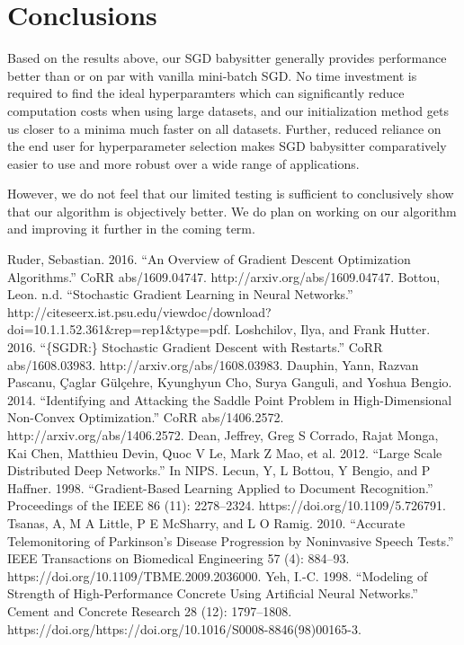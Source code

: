 \documentclass{article}
\begin{document}
\section{Conclusions}
\par Based on the results above, our SGD babysitter generally provides performance better than or on par with vanilla mini-batch SGD. No time investment is required to find the ideal hyperparamters which can significantly reduce computation costs when using large datasets, and our initialization method gets us closer to a minima much faster on all datasets. Further, reduced reliance on the end user for hyperparameter selection makes SGD babysitter comparatively easier to use and more robust over a wide range of applications. 

\par However, we do not feel that our limited testing is sufficient to conclusively show that our algorithm is objectively better. We do plan on working on our algorithm and improving it further in the coming term.
 
\newpage
[1] Ruder, Sebastian. 2016. “An Overview of Gradient Descent Optimization Algorithms.” CoRR abs/1609.04747. http://arxiv.org/abs/1609.04747. \newline \newline
[2] Bottou, Leon. n.d. “Stochastic Gradient Learning in Neural Networks.” http://citeseerx.ist.psu.edu/viewdoc/download?doi=10.1.1.52.361\&rep=rep1\&type=pdf.
\newline \newline
[3] Loshchilov, Ilya, and Frank Hutter. 2016. “\{SGDR:\} Stochastic Gradient Descent with Restarts.” CoRR abs/1608.03983. http://arxiv.org/abs/1608.03983.
\newline \newline
[4] Dauphin, Yann, Razvan Pascanu, Çaglar Gülçehre, Kyunghyun Cho, Surya Ganguli, and Yoshua Bengio. 2014. “Identifying and Attacking the Saddle Point Problem in High-Dimensional Non-Convex Optimization.” CoRR abs/1406.2572. http://arxiv.org/abs/1406.2572.
\newline \newline
[5] Dean, Jeffrey, Greg S Corrado, Rajat Monga, Kai Chen, Matthieu Devin, Quoc V Le, Mark Z Mao, et al. 2012. “Large Scale Distributed Deep Networks.” In NIPS.
\newline \newline
[6] Lecun, Y, L Bottou, Y Bengio, and P Haffner. 1998. “Gradient-Based Learning Applied to Document Recognition.” Proceedings of the IEEE 86 (11): 2278–2324. https://doi.org/10.1109/5.726791.
\newline \newline
[7] Tsanas, A, M A Little, P E McSharry, and L O Ramig. 2010. “Accurate Telemonitoring of Parkinson’s Disease Progression by Noninvasive Speech Tests.” IEEE Transactions on Biomedical Engineering 57 (4): 884–93. https://doi.org/10.1109/TBME.2009.2036000.
\newline \newline
[8] Yeh, I.-C. 1998. “Modeling of Strength of High-Performance Concrete Using Artificial Neural Networks.” Cement and Concrete Research 28 (12): 1797–1808. https://doi.org/https://doi.org/10.1016/S0008-8846(98)00165-3.
\end{document}
